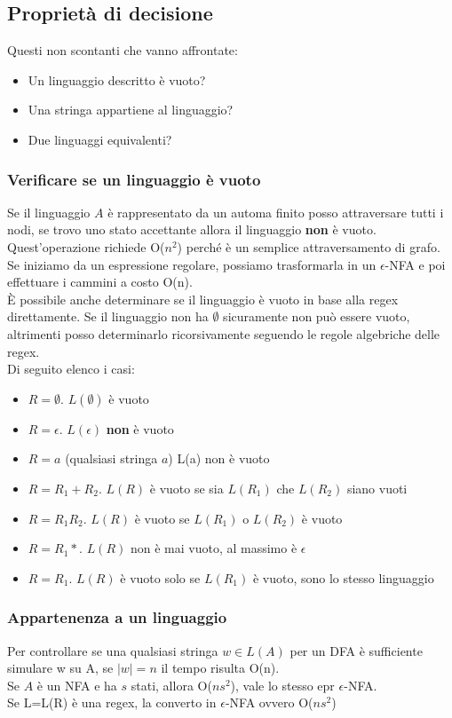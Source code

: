 \documentclass[12pt]{article}
\begin{document}
\subsection{Proprietà di decisione}
Questi non scontanti che vanno affrontate:
\begin{itemize}
  \item Un linguaggio descritto è vuoto?
  \item Una stringa appartiene al linguaggio?
  \item Due linguaggi equivalenti?
\end{itemize}

\subsubsection{Verificare se un linguaggio è vuoto}
Se il linguaggio $A$ è rappresentato da un automa finito posso attraversare tutti i nodi, se trovo uno stato accettante allora il linguaggio \textbf{non} è vuoto. Quest'operazione richiede O($n^2$) perché è un semplice attraversamento di grafo. 
\\ Se iniziamo da un espressione regolare, possiamo trasformarla in un $\epsilon$-NFA e poi effettuare i cammini a costo O(n).
\\ È possibile anche determinare se il linguaggio è vuoto in base alla regex direttamente. Se il linguaggio non ha $\emptyset$ sicuramente non può essere vuoto, altrimenti posso determinarlo ricorsivamente seguendo le regole algebriche delle regex. 
\\ Di seguito elenco i casi: 
\begin{itemize}
  \item $R= \emptyset$. $L(\emptyset)$ è vuoto
  \item $R= \epsilon$. $L(\epsilon)$ \textbf{non} è vuoto
  \item $R=a$ (qualsiasi stringa $a$) L(a) non è vuoto
  \item $R=R_1+R_2$. $L(R)$ è vuoto se sia $L(R_1)$ che $L(R_2)$ siano vuoti
  \item $R=R_1R_2$. $L(R)$ è vuoto se $L(R_1)$ o $L(R_2)$ è vuoto
  \item $R=R_1*$. $L(R)$ non è mai vuoto, al massimo è $\epsilon$
  \item $R=R_1$. $L(R)$ è vuoto solo se $L(R_1)$ è vuoto, sono lo stesso linguaggio
\end{itemize}

\subsubsection{Appartenenza a un linguaggio}
Per controllare se una qualsiasi stringa $w\in L(A)$ per un DFA è sufficiente simulare w su A, se $|w|=n$ il tempo risulta O(n).
\vspace{5mm} \\
Se $A$ è un NFA e ha $s$ stati, allora O($ns^2$), vale lo stesso epr $\epsilon$-NFA.
\vspace{5mm} \\
Se L=L(R) è una regex, la converto in $\epsilon$-NFA ovvero O($ns^2$)
\end{document}
